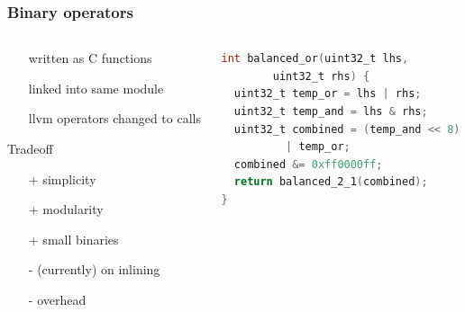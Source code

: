 \documentclass[11pt,t,usepdftitle=false,aspectratio=169]{beamer}
\begin{document}
\begin{frame}[fragile]
  \frametitle{Binary operators}
  \begin{columns}[T]
    \begin{column}{.48\textwidth}
      \begin{itemize}
      \item[] written as C functions
      \item[] linked into same module
      \item[] llvm operators changed to calls
      \end{itemize}
      \vfill
      \begin{block}{Tradeoff}
        \begin{itemize}
        \item[+] simplicity
        \item[+] modularity
        \item[+] small binaries
        \item[-] (currently) on inlining
        \item[-] overhead
        \end{itemize}
      \end{block}
    \end{column}
    \hfill
    \pause
    \begin{column}{.48\textwidth}
      \vspace{0.7cm}
      \begin{lstlisting}[language=C, basicstyle=\small]
int balanced_or(uint32_t lhs,
        uint32_t rhs) {
  uint32_t temp_or = lhs | rhs;
  uint32_t temp_and = lhs & rhs;
  uint32_t combined = (temp_and << 8)
          | temp_or;
  combined &= 0xff0000ff;
  return balanced_2_1(combined);
}
      \end{lstlisting}
    \end{column}
  \end{columns}
\end{frame}
\end{document}
